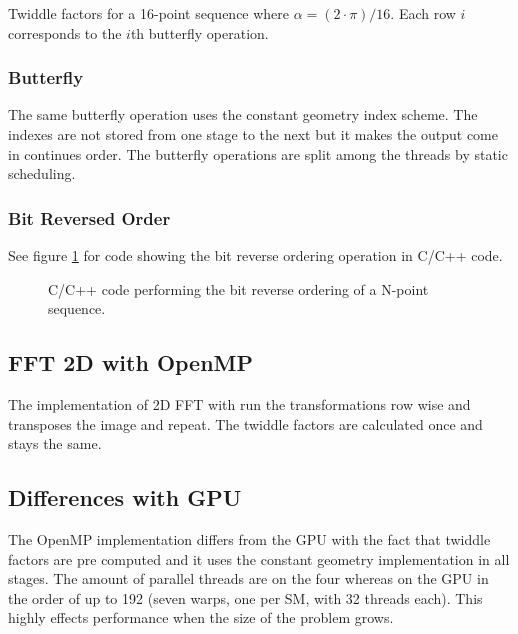 \begin{table}[H]
	\centering
	
	\caption{Twiddle factors for a 16-point sequence where $\alpha = (2 \cdot \pi) / 16$. Each row $i$ corresponds to the $i$th butterfly operation.}
	\label{tab:omp:twiddle-overview}
\end{table}

\subsubsection{Butterfly}

The same butterfly operation uses the constant geometry index scheme. The indexes are not stored from one stage to the next but it makes the output come in continues order. The butterfly operations are split among the threads by static scheduling.

\subsubsection{Bit Reversed Order}

See figure \ref{fig:omp:bit-reverse-order} for code showing the bit reverse ordering operation in C/C++ code.

\begin{figure}[H]
	\centering
	\begin{framed}
			
	\end{framed}
	\caption{ C/C++ code performing the bit reverse ordering of a N-point sequence. }
	\label{fig:omp:bit-reverse-order}
\end{figure}

\subsection{FFT 2D with OpenMP}

The implementation of \gls{2D} \gls{FFT} with {\OMP} run the transformations row wise and transposes the image and repeat. The twiddle factors are calculated once and stays the same.

\subsection{Differences with GPU}

The OpenMP implementation differs from the \gls{GPU} with the fact that twiddle factors are pre computed and it uses the constant geometry implementation in all stages. The amount of parallel threads are on the {\INTELCPU} four whereas on the \gls{GPU} in the order of up to 192 (seven warps, one per \gls{SM}, with 32 threads each). This highly effects performance when the size of the problem grows.

